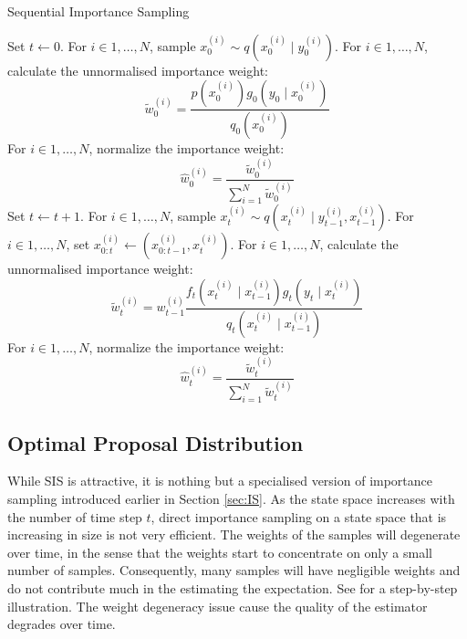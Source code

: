 \begin{algorithm}
\caption{Sequential Importance Sampling}\label{algo:sis}
\begin{algorithmic}[1]
\State Set $t \gets 0$.
\State For $i \in 1, \ldots, N$, sample $x^{(i)}_0 \sim q(x^{(i)}_0 \mid y^{(i)}_0)$.
\State For $i \in 1, \ldots, N$, calculate the unnormalised importance weight:
\begin{equation*}
 \tilde{w}^{(i)}_0 = \dfrac{p(x_0^{(i)})g_0(y_0 \mid x^{(i)}_0)}{q_0(x^{(i)}_0)}
\end{equation*}
\State For $i \in 1, \ldots, N$, normalize the importance weight:
\begin{equation*}
\hat{w}^{(i)}_0 = \dfrac{\tilde{w}^{(i)}_0}{\sum^N_{i=1} \tilde{w}^{(i)}_0}
\end{equation*}
\State Set $t \gets t + 1$.
\State For $i \in 1, \ldots, N$, sample $x^{(i)}_t \sim q(x^{(i)}_t \mid y^{(i)}_{t-1}, x^{(i)}_{t-1})$.
\State For $i \in 1, \ldots, N$, set $x^{(i)}_{0:t} \gets (x^{(i)}_{0:t-1}, x^{(i)}_t)$.
\State For $i \in 1, \ldots, N$, calculate the unnormalised importance weight:
\begin{equation*}
 \tilde{w}^{(i)}_t = w^{(i)}_{t-1} \dfrac{f_t(x^{(i)}_t \mid x^{(i)}_{t-1})g_t(y_t \mid x^{(i)}_t)}{q_t(x^{(i)}_t \mid x^{(i)}_{t-1})}
\end{equation*}
\State For $i \in 1, \ldots, N$, normalize the importance weight:
\begin{equation*}
\hat{w}^{(i)}_t = \dfrac{\tilde{w}^{(i)}_t}{\sum^N_{i=1} \tilde{w}^{(i)}_t}
\end{equation*}
\EndWhile
\EndFunction
\end{algorithmic}
\end{algorithm}

\subsection{Optimal Proposal Distribution}
While SIS is attractive, it is nothing but a specialised version of importance sampling introduced earlier in Section \ref{sec:IS}. As the state space increases with the number of time step $t$, direct importance sampling on a state space that is increasing in size is not very efficient. The weights of the samples will degenerate over time, in the sense that the weights start to concentrate on only a small number of samples. Consequently, many samples will have negligible weights and do not contribute much in the estimating the expectation. See \cite{JAM10} for a step-by-step illustration. The weight degeneracy issue cause the quality of the estimator degrades over time.

